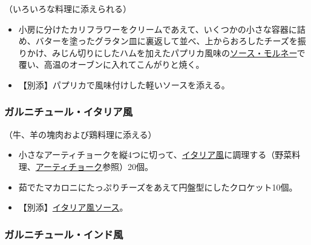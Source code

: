 \begin{recette}


（いろいろな料理に添えられる）

\begin{itemize}
\item
  小房に分けたカリフラワーをクリームであえて、いくつかの小さな容器に詰め、バターを塗ったグラタン皿に裏返して並べ、上からおろしたチーズを振りかけ、みじん切りにしたハムを加えたパプリカ風味の\protect\hyperlink{sauce-mornay}{ソース・モルネー}で覆い、高温のオーブンに入れてこんがりと焼く。
\item
  【別添】パプリカで風味付けした軽いソースを添える。
\end{itemize}

\atoaki{}

\hypertarget{garniture-italienne}{%
\subsubsection{ガルニチュール・イタリア風}\label{garniture-italienne}}



（牛、羊の塊肉および鶏料理に添える）

\begin{itemize}
\item
  小さなアーティチョークを縦4つに切って、\protect\hyperlink{quartiers-d-artichauts-italienne}{イタリア風}に調理する（野菜料理、\protect\hyperlink{artichauts}{アーティチョーク}参照）20個。
\item
  茹でたマカロニにたっぷりチーズをあえて円盤型にしたクロケット10個。
\item
  【別添】\protect\hyperlink{sauce-italienne}{イタリア風ソース}。
\end{itemize}

\atoaki{}

\hypertarget{garniture-indienne}{%
\subsubsection{ガルニチュール・インド風}\label{garniture-indienne}}


\end{recette}
